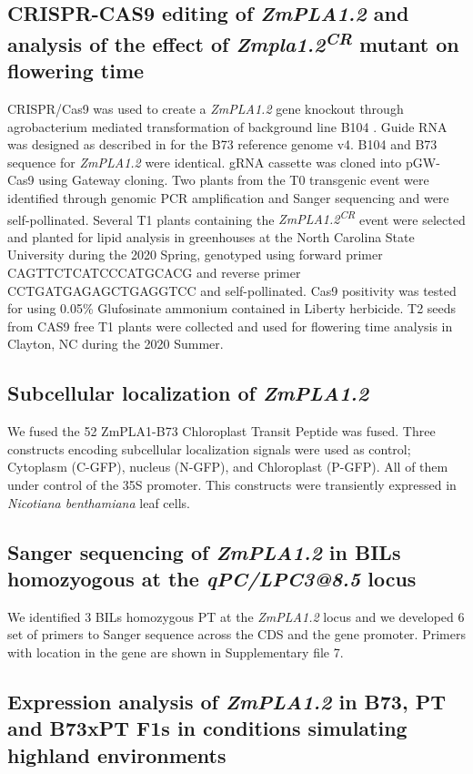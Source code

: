 \documentclass[9pt,twocolumn,twoside,lineno]{BioRxiv}
\begin{document}
\subsection{CRISPR-CAS9 editing of \textit{ZmPLA1.2} and analysis of the effect of \textit{Zmpla1.2\textsuperscript{CR}} mutant on flowering time}
CRISPR/Cas9 was used to create a \textit{ZmPLA1.2} gene knockout through agrobacterium mediated transformation of background line B104 \cite{Wu2020-nq, Char2017-uk}. 
Guide RNA was designed as described in \cite{Brazelton2015-co} for the B73 reference genome v4. 
B104 and B73 sequence for \textit{ZmPLA1.2} were identical. 
gRNA cassette was cloned into pGW-Cas9 using Gateway cloning. 
Two plants from the T0 transgenic event were identified through genomic PCR amplification and Sanger sequencing and were self-pollinated. 
Several T1 plants containing the \textit{ZmPLA1.2\textsuperscript{CR}} event were selected and planted for lipid analysis in greenhouses at the North Carolina State University during the 2020 Spring, genotyped using forward primer CAGTTCTCATCCCATGCACG and reverse primer CCTGATGAGAGCTGAGGTCC and  self-pollinated. 
Cas9 positivity was tested for using 0.05\% Glufosinate ammonium contained in Liberty herbicide. 
T2 seeds from CAS9 free T1 plants were collected and used for flowering time analysis in  Clayton, NC during the 2020 Summer. 
\subsection{Subcellular localization of \textit{ZmPLA1.2}}
We fused the 52 ZmPLA1-B73 Chloroplast Transit Peptide was fused. Three constructs encoding subcellular localization signals were used as control; Cytoplasm (C-GFP), nucleus (N-GFP), and Chloroplast (P-GFP). All of them under control of the 35S promoter. This constructs were transiently expressed in \textit{Nicotiana benthamiana} leaf cells.
\subsection{Sanger sequencing of \textit{ZmPLA1.2} in BILs homozyogous at the \textit{qPC/LPC3@8.5} locus}
We identified 3 BILs homozygous PT at the \textit{ZmPLA1.2} locus and we developed 6 set of primers to Sanger sequence across the CDS and the gene promoter. Primers with location in the gene are shown in Supplementary file 7. 

\subsection{Expression analysis of \textit{ZmPLA1.2} in B73, PT and B73xPT F1s in conditions simulating highland environments}
\end{document}
